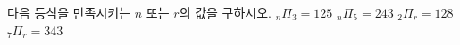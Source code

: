 다음 등식을 만족시키는 $n$ 또는 $r$의 값을 구하시오.
 ${}_n\Pi_3=125$
 ${}_n\Pi_5=243$
 ${}_2\Pi_r=128$
 ${}_7\Pi_r=343$

